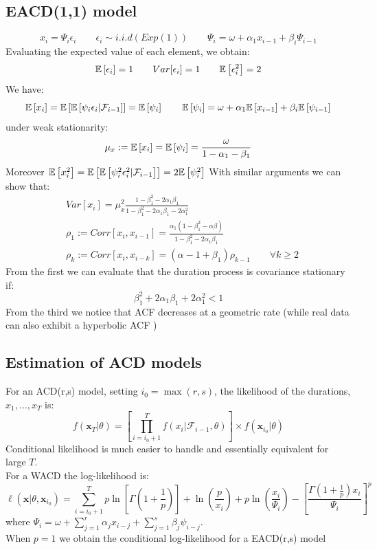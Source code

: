 \subsection{EACD(1,1) model}
\[
x_i = \Psi_i \epsilon_i \qquad \epsilon_i \sim i.i.d(Exp(1)) \qquad \Psi_i = \omega + \alpha_1 x_{i-1} + \beta_i \Psi_{i-1}
\]
Evaluating the expected value of each element, we obtain:
\[
\mathbb{E}\left[\epsilon_i\right] =1 \qquad Var[\epsilon_i] =1 \qquad \mathbb{E}\left[\epsilon_i^2\right] = 2
\]
We have:
\[
\mathbb{E}\left[x_i\right] = \mathbb{E}\left[\mathbb{E}\left[\psi_i\epsilon_i| \mathcal{F}_{i-1}\right]\right] = \mathbb{E}\left[\psi_i\right]  \qquad \mathbb{E}\left[\psi_i\right]= \omega + \alpha_1\mathbb{E}\left[x_{i-1}\right] + \beta_i \mathbb{E}\left[\psi_{i-1}\right]
\]
under weak stationarity:
\[
\mu_x := \mathbb{E}\left[x_i\right] = \mathbb{E}\left[\psi_i\right] = \frac{\omega}{1 - \alpha_1 - \beta_1}
\]
Moreover $\mathbb{E}\left[x_i^2\right] =\mathbb{E}\left[\mathbb{E}\left[\psi_i^2 \epsilon_i^2| \mathcal{F}_{i-1}\right]\right] = 2 \mathbb{E}\left[\psi_i^2\right]$
With similar arguments we can show that:
\begin{align}
	&Var[x_i] = \mu^2_x \frac{1 - \beta_1^2 - 2 \alpha_1\beta_1}{1 - \beta_1^2 - 2\alpha_1 \beta_1 - 2 \alpha_1^2}\\
	&\rho_1 :=  Corr[x_i,x_{i-1}] = \frac{\alpha_1 (1 - \beta_1^2 - \alpha\beta)}{1 -\beta_1^2 - 2\alpha_1 \beta_1}\\
	&\rho_k := Corr[x_i, x_{i-k}] = (\alpha-1 + \beta_1) \rho_{k-1} \qquad \forall k\geq 2
\end{align}
From the first we can evaluate that the duration process is covariance stationary if:
\[
\beta_1^2 + 2\alpha_1 \beta_1 + 2\alpha_1^2 <1
\]
From the third we notice that ACF decreases at a geometric rate (while real data can also exhibit a hyperbolic ACF
)
\subsection{Estimation of ACD models}
For an ACD(r,s) model, setting $i_0 = \max(r,s)$, the likelihood of the durations, $x_1,\ldots,x_T$ is:
\[
f(\mathbf{x}_T| \theta) = \left[\prod_{i=i_0 +1}^{T} f(x_i|\mathcal{F}_{i-1},\theta)\right] \times f(\mathbf{x}_{i_0}|\theta)
\]
Conditional likelihood is much easier to handle and essentially equivalent for large $T$.\\
For a WACD the log-likelihood is:
\[
\ell(\mathbf{x}| \theta, \mathbf{x}_{i_0}) = \sum_{i = i_0 +1}^{T} p \ln \left[\Gamma \left(1 + \frac{1}{p}\right)\right] + \ln \left(\frac{p}{x_i}\right) + p \ln \left(\frac{x_i}{\Psi_i}\right) - \left[\frac{\Gamma\left(1 + \frac{1}{p}\right)x_i}{\Psi_i}\right]^p
\]
where $\Psi_i = \omega + \sum_{j=1}^r \alpha_j x_{i-j} + \sum_{j=1}^{s} \beta_j \psi_{i-j}$.\\
When $p=1$ we obtain the conditional log-likelihood for a EACD(r,s) model
